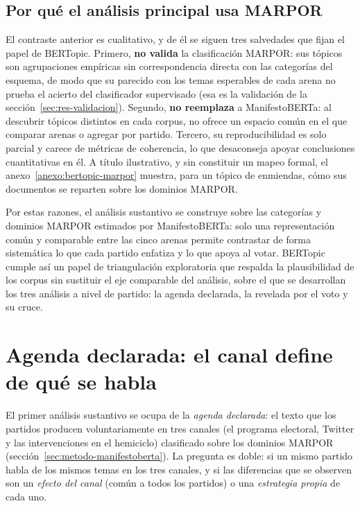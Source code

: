 \subsection{Por qué el análisis principal usa MARPOR}
\label{sec:res-bt-por-que-marpor}

El contraste anterior es cualitativo, y de él se siguen tres salvedades que fijan
el papel de BERTopic. Primero, \textbf{no valida} la clasificación MARPOR: sus
tópicos son agrupaciones empíricas sin correspondencia directa con las categorías
del esquema, de modo que su parecido con los temas esperables de cada arena no
prueba el acierto del clasificador supervisado (esa es la validación de la
sección~\ref{sec:res-validacion}). Segundo, \textbf{no reemplaza} a
ManifestoBERTa: al descubrir tópicos distintos en cada corpus, no ofrece un
espacio común en el que comparar arenas o agregar por partido. Tercero, su
reproducibilidad es solo parcial y carece de métricas de coherencia, lo que
desaconseja apoyar conclusiones cuantitativas en él. A título ilustrativo, y sin
constituir un mapeo formal, el anexo~\ref{anexo:bertopic-marpor} muestra, para
un tópico de enmiendas, cómo sus documentos se reparten sobre los dominios MARPOR.

Por estas razones, el análisis sustantivo se construye sobre las categorías y
dominios MARPOR estimados por ManifestoBERTa: solo una representación común y
comparable entre las cinco arenas permite contrastar de forma sistemática lo que
cada partido enfatiza y lo que apoya al votar. BERTopic cumple así un papel de
triangulación exploratoria que respalda la plausibilidad de los corpus sin
sustituir el eje comparable del análisis, sobre el que se desarrollan los tres
análisis a nivel de partido: la agenda declarada, la revelada por el voto y su
cruce.

\section{Agenda declarada: el canal define de qué se habla}
\label{sec:res-declarada}

El primer análisis sustantivo se ocupa de la \emph{agenda declarada}: el texto
que los partidos producen voluntariamente en tres canales (el programa
electoral, Twitter y las intervenciones en el hemiciclo) clasificado sobre los
dominios MARPOR (sección~\ref{sec:metodo-manifestoberta}). La pregunta es doble:
si un mismo partido habla de los mismos temas en los tres canales, y si las
diferencias que se observen son un \emph{efecto del canal} (común a todos los
partidos) o una \emph{estrategia propia} de cada uno.

